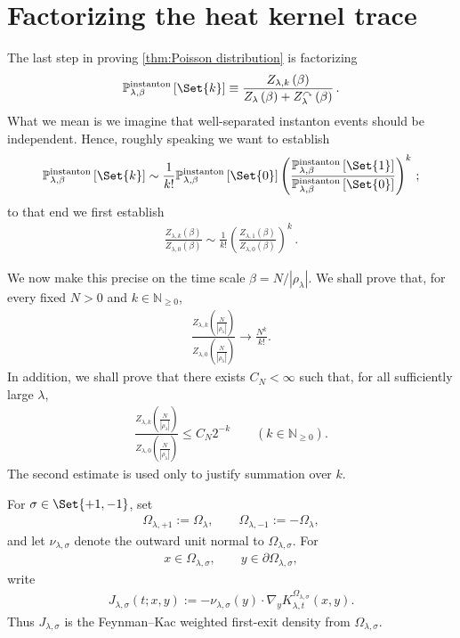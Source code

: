\documentclass[a4paper,10pt]{article}
\numberwithin{equation}{section}
\theoremstyle{plain}
\theoremstyle{plain}
\theoremstyle{plain}
\theoremstyle{plain}
\theoremstyle{plain}
\theoremstyle{remark}
\theoremstyle{definition}
\newcommand{\NN}{\mathbb{N}}
\newcommand{\abs}[1]{\left\lvert#1\right\rvert}
\newcommand{\eq}[1]{\begin{align*}#1\end{align*}}
\newcommand{\eql}[1]{\begin{align}#1\end{align}}
\newcommand{\br}[1]{\left(#1\right)}
\begin{document}
\section{Factorizing the heat kernel trace}
\label{sec:factorizing-heat-kernel-trace}

The last step in proving \cref{thm:Poisson distribution} is factorizing \eq{
\mathbb{P}_{\lambda,\beta}^{\text{instanton}}\left[\Set{k}\right] \equiv \frac{Z_{\lambda,k}\left(\beta\right)}{Z_{\lambda}\left(\beta\right)+Z_{\lambda}^\curvearrowright \left(\beta\right)}\,.
} What we mean is we imagine that well-separated instanton events should be independent. Hence, roughly speaking we want to establish
\eq{
\mathbb{P}_{\lambda,\beta}^{\text{instanton}}\left[\Set{k}\right] \sim \frac{1}{k!}\mathbb{P}_{\lambda,\beta}^{\text{instanton}}\left[\Set{0}\right] \br{\frac{\mathbb{P}_{\lambda,\beta}^{\text{instanton}}\left[\Set{1}\right]}{\mathbb{P}_{\lambda,\beta}^{\text{instanton}}\left[\Set{0}\right]}}^k\,;
} to that end we first establish
\eq{
\frac{Z_{\lambda,k}\left(\beta\right)}{Z_{\lambda,0}\left(\beta\right)} \sim \frac{1}{k!}\br{\frac{Z_{\lambda,1}\left(\beta\right)}{Z_{\lambda,0}\left(\beta\right)}}^k\,.
}

We now make this precise on the time scale $\beta=N/\abs{\rho_\lambda}$. We shall prove that, for every fixed $N>0$ and $k\in\NN_{\geq0}$,
\eql{
\frac{
Z_{\lambda,k}\br{\frac{N}{\abs{\rho_\lambda}}}
}{
Z_{\lambda,0}\br{\frac{N}{\abs{\rho_\lambda}}}
}
\longrightarrow
\frac{N^k}{k!}.
\label{eq:fixed-k-factorization}
}
In addition, we shall prove that there exists $C_N<\infty$ such that, for all sufficiently large $\lambda$,
\eql{
\frac{
Z_{\lambda,k}\br{\frac{N}{\abs{\rho_\lambda}}}
}{
Z_{\lambda,0}\br{\frac{N}{\abs{\rho_\lambda}}}
}
\leq
C_N2^{-k}
\qquad
(k\in\NN_{\geq0}).
\label{eq:summable-uniform-k-bound}
}
The second estimate is used only to justify summation over $k$.

For $\sigma\in\Set{+1,-1}$, set
\eq{
\Omega_{\lambda,+1}:=\Omega_\lambda,
\qquad
\Omega_{\lambda,-1}:=-\Omega_\lambda,
}
and let $\nu_{\lambda,\sigma}$ denote the outward unit normal to $\Omega_{\lambda,\sigma}$. For
\eq{
x\in\Omega_{\lambda,\sigma},
\qquad
y\in\partial\Omega_{\lambda,\sigma},
}
write
\eql{
J_{\lambda,\sigma}(t;x,y)
:=-\nu_{\lambda,\sigma}(y)\cdot
\nabla_yK_{\lambda,t}^{\Omega_{\lambda,\sigma}}(x,y).
\label{eq:passage-flux-kernel}
}
Thus $J_{\lambda,\sigma}$ is the Feynman--Kac weighted first-exit density from $\Omega_{\lambda,\sigma}$.
\end{document}
